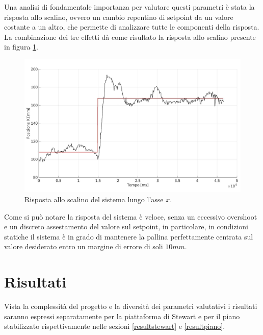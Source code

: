 \documentclass[12pt,twoside,openright]{report}
\begin{document}
Una analisi di fondamentale importanza per valutare questi parametri è stata la risposta allo scalino, ovvero un cambio repentino di setpoint da un valore costante a un altro, che permette di analizzare tutte le componenti della risposta. La combinazione dei tre effetti dà come risultato la risposta allo scalino presente in figura \ref{fig:step}.
\begin{figure}[h!]
\centering

\includegraphics[width=\textwidth]{step2.jpg}

\caption{Risposta allo scalino del sistema lungo l'asse $x$.} \label{fig:step}
\end{figure}
Come si può notare la risposta del sistema è veloce, senza un eccessivo overshoot e un discreto assestamento del valore sul setpoint, in particolare, in condizioni statiche il sistema è in grado di mantenere la pallina perfettamente centrata sul valore desiderato entro un margine di errore di soli $10mm$.
\chapter{Risultati}\label{risultati}
Vista la complessità del progetto e la diversità dei parametri valutativi i risultati saranno espressi separatamente per la piattaforma di Stewart e per il piano stabilizzato rispettivamente nelle sezioni \ref{resultstewart} e \ref{resultpiano}.
\end{document}
